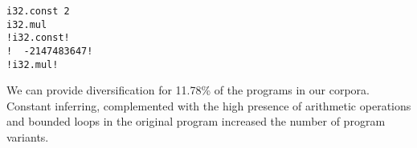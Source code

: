 {\begin{code}
\begin{minipage}[b]{0.32\linewidth}
\begin{minipage}[t]{0.46\linewidth}
            \begin{lstlisting}
i32.const 2
i32.mul
!i32.const!
!  -2147483647!
!i32.mul!
            \end{lstlisting}
        \end{minipage}
    \end{minipage}
    \end{code}
}

\begin{tcolorbox}[title=Answer to RQ1.,boxrule=2pt,arc=.3em,boxsep=1.5mm]
    We can provide diversification for 11.78\% of the programs in our corpora. Constant inferring, complemented with the high presence of arithmetic operations and bounded loops in the original program increased the number of program variants. 
\end{tcolorbox}



\begin{comment}

While our work is very limited by the provided corpora, it can be easily extended to other\dots

An application that benefits from the ablity of CROW is the large amount of generated variants. 


- CHeckLong questions for 80%
- Stress how to do experiments in Software Engineering, the theory behind how to do this in CS.
- The objects of the experiments are programs that ... 
- Motivate the corpora selection, size, can be ported, security sensitive, etc,
- Do not mention CROW in the selection criteria.
- The motivation is not related to tools, only to concepts
- Move paragraph after listing of coprpora to before.
- 


\end{comment}